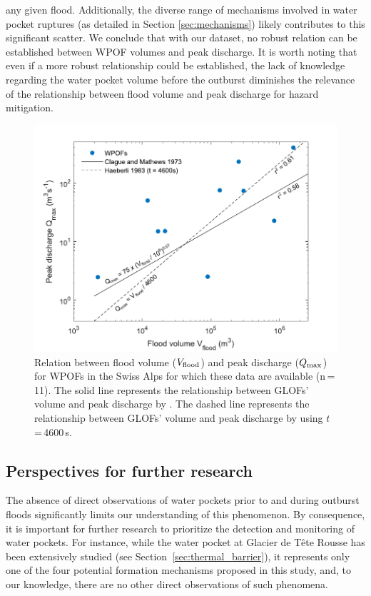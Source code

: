 any given flood. Additionally, the diverse range of mechanisms involved in water pocket ruptures (as detailed in Section \ref{sec:mechanisms}) likely contributes to this significant scatter. We conclude that with our dataset, no robust relation can be established between WPOF volumes and peak discharge. It is worth noting that even if a more robust relationship could be established, the lack of knowledge regarding the water pocket volume before the outburst diminishes the relevance of the relationship between flood volume and peak discharge for hazard mitigation.


\begin{figure}
    \centering
    \includegraphics[width=0.8\linewidth]{chapters/chapter_WPOFs/Qmax_Vflood_scaling.pdf}
    \caption{Relation between flood volume ($V_{\rm{flood}}$) and peak discharge ($Q_{\rm{max}}$) for WPOFs in the Swiss Alps for which these data are available (n\,=\,11). The solid line represents the relationship between GLOFs' volume and peak discharge by \cite{Clague&Mathews1973}. The dashed line represents the relationship between GLOFs' volume and peak discharge by \cite{Haeberli1983} using $t$\,=\,4600\,s.}
    \label{fig:vflood_qmax}
\end{figure}


\subsection{ Perspectives for further research}

The absence of direct observations of water pockets prior to and during outburst floods significantly limits our understanding of this phenomenon. By consequence, it is important for further research to prioritize the detection and monitoring of water pockets. For instance, while the water pocket at Glacier de Tête Rousse has been extensively studied (see Section~\ref{sec:thermal_barrier}), it represents only one of the four potential formation mechanisms proposed in this study, and, to our knowledge, there are no other direct observations of such phenomena. 

